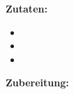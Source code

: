 

\textbf {Zutaten:} \\
\begin{itemize}
	\item 
	\item 
	\item
\end{itemize}

\vspace* {2cm}

\textbf {Zubereitung:} \\
\begin{compactenum}
	\item 
	\item
	\item
\end{compactenum}


